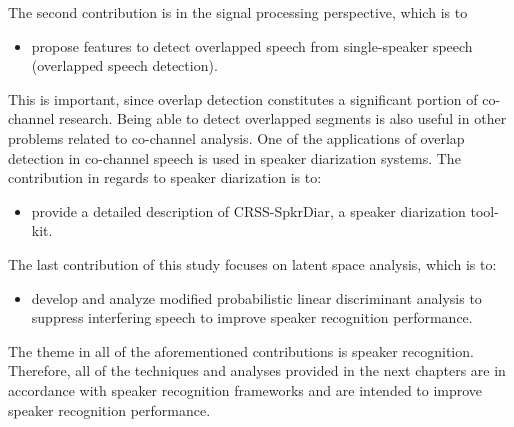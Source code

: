 The second contribution is in the signal processing perspective, which is to
\begin{itemize}
	\item propose features to detect overlapped speech from single-speaker speech (overlapped speech detection).
\end{itemize}
This is important, since overlap detection constitutes a significant portion of co-channel research. 
Being able to detect overlapped segments is also useful in other problems related to co-channel analysis. 
One of the applications of overlap detection in co-channel speech is used in speaker diarization systems. 
The contribution in regards to speaker diarization is to:
\begin{itemize}
	\item provide a detailed description of CRSS-SpkrDiar, a speaker diarization tool-kit. 
\end{itemize}
The last contribution of this study focuses on latent space analysis, which is to:
\begin{itemize}
	\item develop and analyze modified probabilistic linear discriminant analysis to suppress interfering speech to improve speaker recognition performance. 
\end{itemize}
The theme in all of the aforementioned contributions is speaker recognition. 
Therefore, all of the techniques and analyses provided in the next chapters are in accordance with speaker recognition frameworks and are intended to improve speaker recognition performance. 